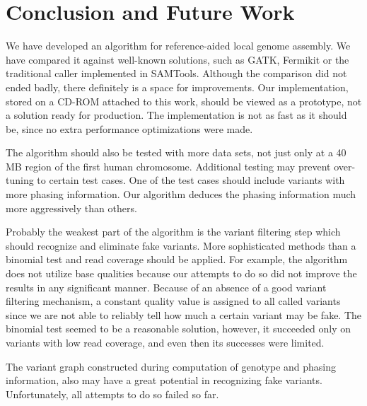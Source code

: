 \chapter{Conclusion and Future Work}
\label{chap:conclusion}

We have developed an algorithm for reference-aided local genome assembly. We have compared it against well-known solutions, such as GATK, Fermikit or the traditional caller implemented in SAMTools. Although the comparison did not ended badly, there definitely is a space for improvements. Our implementation, stored on a CD-ROM attached to this work, should be viewed as a prototype, not a solution ready for production. The implementation is not as fast as it should be, since no extra performance optimizations were made.

The algorithm should also be tested with more data sets, not just only at a 40 MB region of the first human chromosome. Additional testing may prevent over-tuning to certain test cases. One of the test cases should include variants with more phasing information. Our algorithm deduces the phasing information much more aggressively than others.

Probably the weakest part of the algorithm is the variant filtering step which should recognize and eliminate fake variants. More sophisticated methods than a binomial test and read coverage should be applied. For example, the algorithm does not utilize base qualities because our attempts to do so did not improve the results in any significant manner. Because of an absence of a good variant filtering mechanism, a constant quality value is assigned to all called variants since we are not able to reliably tell how much a certain variant may be fake. The binomial test seemed to be a reasonable solution, however, it succeeded only on variants with low read coverage, and even then its successes were limited.

The variant graph constructed during computation of genotype and phasing information, also may have a great potential in recognizing fake variants. Unfortunately, all attempts to do so failed so far.